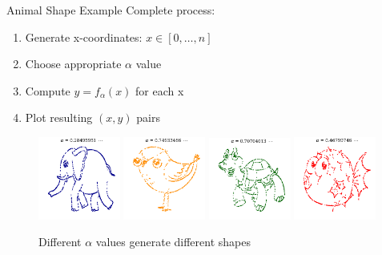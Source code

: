\documentclass[10pt]{beamer}
\begin{document}
\begin{frame}{Animal Shape Example}
Complete process:
\begin{enumerate}
\item Generate x-coordinates: $x \in [0,\ldots,n]$
\item Choose appropriate $\alpha$ value
\item Compute $y = f_\alpha(x)$ for each x
\item Plot resulting $(x,y)$ pairs
\end{enumerate}

\begin{figure}
\includegraphics[width=0.24\textwidth]{fig/note01/elephant.png}
\includegraphics[width=0.24\textwidth]{fig/note01/bird.png}
\includegraphics[width=0.24\textwidth]{fig/note01/turtle.png}
\includegraphics[width=0.24\textwidth]{fig/note01/fish.png}
\caption{Different $\alpha$ values generate different shapes}
\end{figure}
\end{frame}
\end{document}
